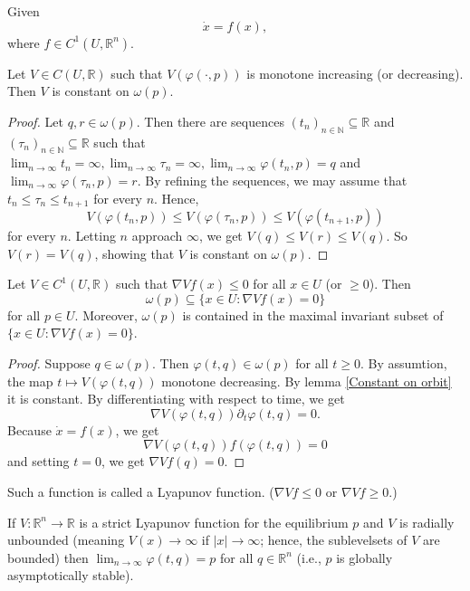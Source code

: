 \documentclass{article}
\newcommand*{\N}{\mathbb{N}}
\newcommand*{\R}{\mathbb{R}}
\newcommand*{\Rn}{{\mathbb{R}^n}}
\newcommand*{\limn}{\lim_{n\to\infty}}
\begin{document}
Given
$$\dot x = f(x),$$
where $f \in C^1(U, \Rn)$.

\begin{lem}
    Let $V \in C(U,\R)$ such that $V(\varphi(\cdot, p))$ is monotone increasing (or decreasing). Then $V$ is constant on $\omega(p)$.
    \label{Constant on orbit}
\end{lem}

\begin{proof}
    Let $q,r \in \omega(p)$. Then there are sequences $(t_n)_{n\in\N}\subseteq \R$ and $(\tau_n)_{n\in\N} \subseteq \R$ such that $\lim_{n\to\infty} t_n = \infty, \lim_{n\to\infty}\tau_n = \infty, \limn \varphi(t_n,p)=q$ and $ \limn \varphi(\tau_n,p)=r$. By refining the sequences, we may assume that $t_n \leq \tau_n \leq t_{n+1}$ for every $n$. Hence,
    $$V(\varphi(t_n,p)) \leq V(\varphi(\tau_n,p)) \leq V(\varphi(t_{n+1},p))$$
    for every $n$. Letting $n$ approach $\infty$, we get $V(q) \leq V(r) \leq V(q)$. So $V(r)=V(q)$, showing that $V$ is constant on $\omega(p)$.
\end{proof}

\begin{thm}
    Let $V \in C^1(U,\R)$ such that $\nabla Vf(x)\leq 0$ for all $x \in U$ (or $\geq 0$). Then
    $$\omega(p)\subseteq \{x\in U:\nabla Vf(x)=0\}$$
    for all $p \in U$. Moreover, $\omega(p)$ is contained in the maximal invariant subset of $\{x\in U:\nabla Vf(x)=0\}$.
\end{thm}

\begin{proof}
    Suppose $q \in \omega(p)$. Then $\varphi(t,q) \in \omega(p)$ for all $t \geq 0$. By assumtion, the map $t \mapsto V(\varphi(t,q))$ monotone decreasing. By lemma \ref{Constant on orbit} it is constant. By differentiating with respect to time, we get
    $$\nabla V(\varphi(t,q))\partial_t\varphi(t,q) = 0.$$
    Because $\dot x = f(x)$, we get
    $$\nabla V(\varphi(t,q))f(\varphi(t,q)) = 0$$
    and setting $t=0$, we get $\nabla Vf(q)=0$.
\end{proof}

\begin{rem}
    Such a function is called a Lyapunov function. ($\nabla Vf \leq 0$ or $\nabla Vf \geq 0$.)
\end{rem}

\begin{thm}
    If $V:\Rn \to \R$ is a strict Lyapunov function for the equilibrium $p$ and $V$ is radially unbounded (meaning $V(x) \to \infty$ if $|x| \to \infty$; hence, the sublevelsets of $V$ are bounded) then $\limn\varphi(t,q) = p$ for all $q \in \Rn$ (i.e., $p$ is globally asymptotically stable).
\end{thm}
\end{document}
